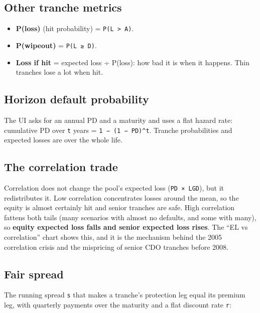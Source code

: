 \documentclass[10pt,a4paper]{article}
\providecommand{\tightlist}{\setlength{\itemsep}{1pt}\setlength{\parskip}{0pt}}
\numberwithin{equation}{section}
\begin{document}
\subsection{Other tranche metrics}\label{other-tranche-metrics}

\begin{itemize}
\tightlist
\item
  \textbf{P(loss)} (hit probability) = \texttt{P(L\ \textgreater{}\ A)}.
\item
  \textbf{P(wipeout)} = \texttt{P(L\ ≥\ D)}.
\item
  \textbf{Loss if hit} = expected loss ÷ P(loss): how bad it is when it happens. Thin tranches lose a lot when hit.
\end{itemize}

\subsection{Horizon default probability}\label{horizon-default-probability}

The UI asks for an annual PD and a maturity and uses a flat hazard rate: cumulative PD over \texttt{t} years = \texttt{1\ −\ (1\ −\ PD)\^{}t}. Tranche probabilities and expected losses are over the whole life.

\subsection{The correlation trade}\label{the-correlation-trade}

Correlation does not change the pool's expected loss (\texttt{PD\ ×\ LGD}), but it redistributes it. Low correlation concentrates losses around the mean, so the equity is almost certainly hit and senior tranches are safe. High correlation fattens both tails (many scenarios with almost no defaults, and some with many), so \textbf{equity expected loss falls and senior expected loss rises}. The ``EL vs correlation'' chart shows this, and it is the mechanism behind the 2005 correlation crisis and the mispricing of senior CDO tranches before 2008.

\subsection{Fair spread}\label{fair-spread}

The running spread \texttt{s} that makes a tranche's protection leg equal its premium leg, with quarterly payments over the maturity and a flat discount rate \texttt{r}:
\end{document}
